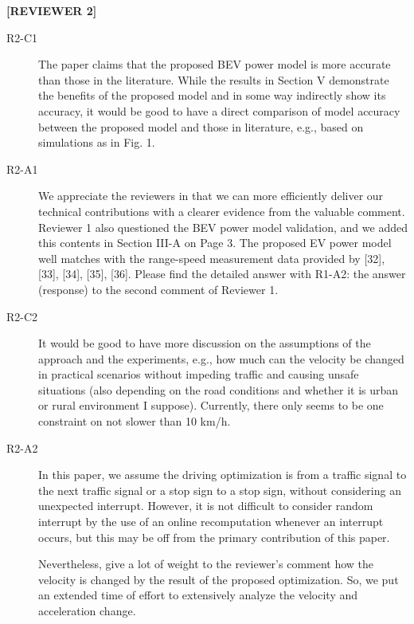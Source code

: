 \documentclass[onecolumn]{IEEEconf}
\begin{document}
\textbf{[REVIEWER 2]}
\begin{description}

\item [R2-C1] The paper claims that the proposed BEV power model is more accurate than those in the literature. While the results in Section V demonstrate the benefits of the proposed model and in some way indirectly show its accuracy, it would be good to have a direct comparison of model accuracy between the proposed model and those in literature, e.g., based on simulations as in Fig. 1. 

\item [R2-A1] We appreciate the reviewers in that we can more efficiently deliver our technical contributions with a clearer evidence from the valuable comment. Reviewer 1 also questioned the BEV power model validation, and we added this contents in Section III-A on Page 3. The proposed EV power model well matches with the range-speed measurement  data provided by [32], [33], [34], [35], [36]. Please find the detailed answer with R1-A2: the answer (response) to the second comment of Reviewer 1.

\item [R2-C2] It would be good to have more discussion on the assumptions of the approach and the experiments, e.g., how much can the velocity be changed in practical scenarios without impeding traffic and causing unsafe situations (also depending on the road conditions and whether it is urban or rural environment I suppose). Currently, there only seems to be one constraint on not slower than 10 km/h. 

\item [R2-A2] In this paper, we assume the driving optimization is from a traffic signal to the next traffic signal or a stop sign to a stop sign, without considering an unexpected interrupt. However, it is not difficult to consider random interrupt by the use of an online recomputation whenever an interrupt occurs, but this may be off from the primary contribution of this paper. 

Nevertheless, give a lot of weight to the reviewer’s comment how the velocity is changed by the result of the proposed optimization. So, we put an extended time of effort to extensively analyze the velocity and acceleration change.


\end{description}
\end{document}
